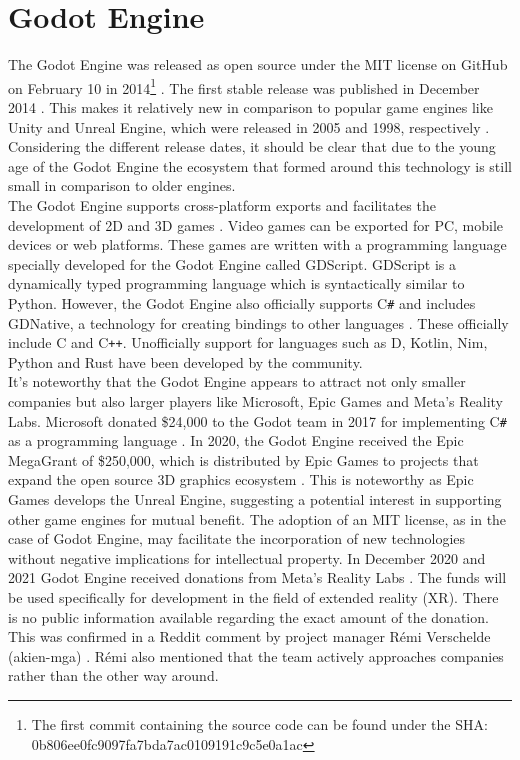\section{Godot Engine}
The Godot Engine was released as open source under the MIT license on GitHub on February 10 in 2014\footnote{The first commit containing the source code can be found under the SHA:\\ 0b806ee0fc9097fa7bda7ac0109191c9c5e0a1ac} \cite{godot-repository}.
The first stable release was published in December 2014 \cite{godot-release}.
This makes it relatively new in comparison to popular game engines like Unity and Unreal Engine, which were released in 2005 and 1998, respectively \cite{unity-release, unreal-release}.
Considering the different release dates, it should be clear that due to the young age of the Godot Engine the ecosystem that formed around this technology is still small in comparison to older engines.\\

The Godot Engine supports cross-platform exports and facilitates the development of 2D and 3D games \cite{godot-engine}.
Video games can be exported for PC, mobile devices or web platforms.
These games are written with a programming language specially developed for the Godot Engine called GDScript.
GDScript is a dynamically typed programming language which is syntactically similar to Python.
However, the Godot Engine also officially supports C\texttt{\#} and includes GDNative, a technology for creating bindings to other languages \cite{godot-gdnative}.
These officially include C and C\texttt{++}.
Unofficially support for languages such as D, Kotlin, Nim, Python and Rust have been developed by the community.\\

It's noteworthy that the Godot Engine appears to attract not only smaller companies but also larger players like Microsoft, Epic Games and Meta's Reality Labs.
Microsoft donated \$24,000 to the Godot team in 2017 for implementing C\texttt{\#} as a programming language \cite{godot-csharp}.
In 2020, the Godot Engine received the Epic MegaGrant of \$250,000, which is distributed by Epic Games to projects that expand the open source 3D graphics ecosystem \cite{godot-megagrant}.
This is noteworthy as Epic Games develops the Unreal Engine, suggesting a potential interest in supporting other game engines for mutual benefit.
The adoption of an MIT license, as in the case of Godot Engine, may facilitate the incorporation of new technologies without negative implications for intellectual property.
In December 2020 and 2021 Godot Engine received donations from Meta's Reality Labs \cite{godot-facebook-reality, godot-meta-reality}.
The funds will be used specifically for development in the field of extended reality (XR).
There is no public information available regarding the exact amount of the donation.
This was confirmed in a Reddit comment by project manager Rémi Verschelde (akien-mga) \cite{reddit-companies-akien}.
Rémi also mentioned that the team actively approaches companies rather than the other way around.
